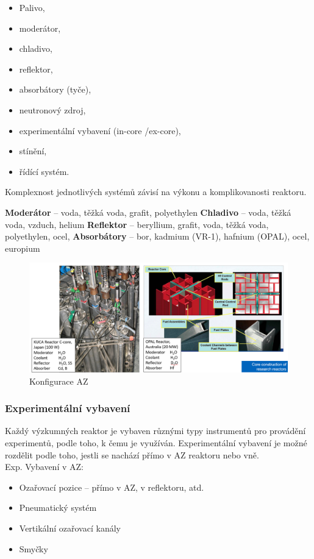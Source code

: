 \begin{itemize}
    \item Palivo,
    \item moderátor,
    \item chladivo,
    \item reflektor,
    \item absorbátory (tyče),
    \item neutronový zdroj,
    \item experimentální vybavení (in-core /ex-core),
    \item stínění,
    \item řídící systém.
\end{itemize}

Komplexnost jednotlivých systémů závisí na výkonu a komplikovanosti reaktoru.

\textbf{Moderátor} -- voda, těžká voda, grafit, polyethylen
\textbf{Chladivo} -- voda, těžká voda, vzduch, helium
\textbf{Reflektor} -- beryllium, grafit, voda, těžká voda, polyethylen, ocel,
\textbf{Absorbátory} -- bor, kadmium (VR-1), hafnium (OPAL), ocel, europium

\begin{figure}[H]
    \centering
    \includegraphics[width=0.75\linewidth]{img/KonfiguraceAZ.png}
    \caption{Konfigurace AZ}
    \label{fig:enter-label}
\end{figure}

\subsubsection*{Experimentální vybavení}

Každý výzkumných reaktor je vybaven různými typy instrumentů pro provádění experimentů, podle toho, k čemu je využíván.  Experimentální vybavení je možné rozdělit podle toho, jestli se nachází přímo v AZ reaktoru nebo vně. \\
Exp. Vybavení v AZ:

\begin{itemize}
    \item Ozařovací pozice -- přímo v AZ, v reflektoru, atd.
    \item Pneumatický systém
    \item Vertikální ozařovací kanály
    \item Smyčky
\end{itemize}

